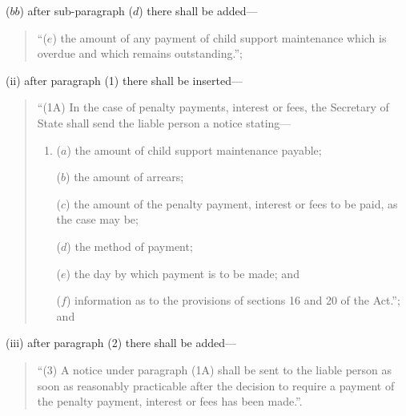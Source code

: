 \documentclass[12pt,a4paper]{article}
\begin{document}
\begin{enumerate}
\begin{enumerate}
\begin{enumerate}
($bb$) after sub-paragraph ($d$)  there shall be added—
\begin{quotation}
“($e$) the amount of any payment of child support maintenance which is overdue and which remains outstanding.”;
\end{quotation}
\end{enumerate}

(ii) after paragraph (1) there shall be inserted—
\begin{quotation}
“(1A) In the case of penalty payments, interest or fees, the Secretary of State shall send the liable person a notice stating—
\begin{enumerate}\item[]
($a$) the amount of child support maintenance payable;

($b$) the amount of arrears;

($c$) the amount of the penalty payment, interest or fees to be paid, as the case may be;

($d$) the method of payment;

($e$) the day by which payment is to be made; and

($f$) information as to the provisions of sections 16 and 20 of the Act.”; and
\end{enumerate}
\end{quotation}

(iii) after paragraph (2) there shall be added—
\begin{quotation}
“(3) A notice under paragraph (1A) shall be sent to the liable person as soon as reasonably practicable after the decision to require a payment of the penalty payment, interest or fees has been made.”.
\end{quotation}
\end{enumerate}
\end{enumerate}
\end{document}
